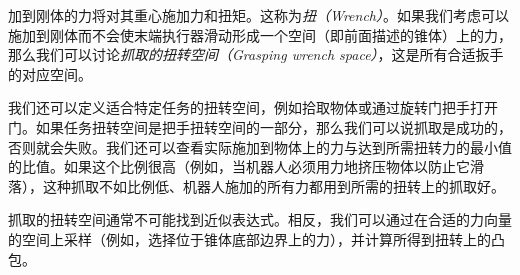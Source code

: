 
加到刚体的力将对其重心施加力和扭矩。这称为\emph{扭（Wrench）}。如果我们考虑可以施加到刚体而不会使末端执行器滑动形成一个空间（即前面描述的锥体）上的力，那么我们可以讨论\emph{抓取的扭转空间（Grasping wrench space）}，这是所有合适扳手的对应空间。


我们还可以定义适合特定任务的扭转空间，例如拾取物体或通过旋转门把手打开门。如果任务扭转空间是把手扭转空间的一部分，那么我们可以说抓取是成功的，否则就会失败。我们还可以查看实际施加到物体上的力与达到所需扭转力的最小值的比值。如果这个比例很高（例如，当机器人必须用力地挤压物体以防止它滑落），这种抓取不如比例低、机器人施加的所有力都用到所需的扭转上的抓取好。


抓取的扭转空间通常不可能找到近似表达式。相反，我们可以通过在合适的力向量的空间上采样（例如，选择位于锥体底部边界上的力），并计算所得到扭转上的凸包。


